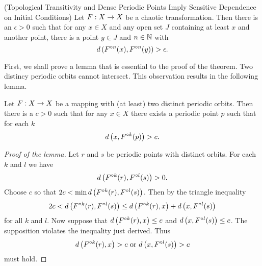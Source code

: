 \documentclass[12pt,draft,twoside]{book}
\begin{document}
\begin{theorem}
  (Topological Transitivity and Dense Periodic Points Imply Sensitive Dependence on Initial Conditions)
  Let $F: X\rightarrow X$ be a chaotic transformation. Then there is an $\epsilon > 0$ such that
  for any $x\in X$ and any open set $J$ containing at least $x$ and another point, there is
  a point $y\in J$ and $n\in \mathbb{N}$ with
  \begin{equation*}
    d\left( F^{\circ n}(x),F^{\circ n}(y) \right) > \epsilon.
  \end{equation*}
  \label{thm:banks}
\end{theorem}
First, we shall prove a lemma that is essential to the proof of the theorem.
Two distincy periodic orbits cannot intersect.
This observation results in the following lemma.
\begin{lemma}
  Let $F: X\rightarrow X$ be a mapping with (at least) two distinct periodic orbits.
  Then there is a $c > 0$ such that for any $x\in X$ there exists a periodic
  point $p$ such that for each $k$
  \begin{equation*}
    d\left( x, F^{\circ k}(p) \right) > c.
  \end{equation*}
  \label{lem:dev1}
\begin{proof}[Proof of the lemma]
  Let $r$ and $s$ be periodic points with distinct orbits. For each $k$ and $l$ we have
  \begin{equation*}
    d\left( F^{\circ k}(r), F^{\circ l}(s) \right) > 0.
  \end{equation*}
  Choose $c$ so that $2c < \min d\left( F^{\circ k}(r),F^{\circ l}(s) \right)$.
  Then by the triangle inequality
  \begin{equation*}
    2c < d\left( F^{\circ k}(r),F^{\circ l}(s) \right) \leq d\left( F^{\circ k}(r),x \right) + d\left( x,F^{\circ l}(s) \right)
  \end{equation*}
  for all $k$ and $l$.
  Now suppose that $d\left( F^{\circ k}(r),x \right) \leq c$ and $d\left( x,F^{\circ l}(s) \right) \leq c$. The supposition
  violates the inequality just derived. Thus 
  \begin{equation*}
    d\left( F^{\circ k}(r),x \right) > c \mbox{ or } d\left( x,F^{\circ l}(s) \right) > c
  \end{equation*}
  must hold.
\end{proof}
\end{lemma}
%
\end{document}
